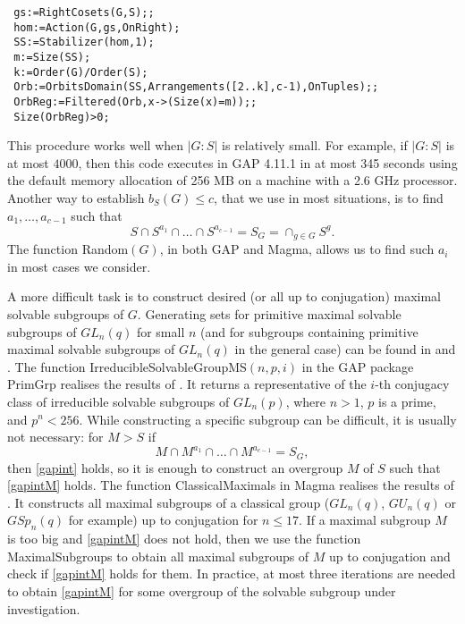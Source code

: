 \lstset{
basicstyle=\ttfamily}  
{\small
\begin{lstlisting}
 gs:=RightCosets(G,S);;
 hom:=Action(G,gs,OnRight);
 SS:=Stabilizer(hom,1);
 m:=Size(SS);
 k:=Order(G)/Order(S);
 Orb:=OrbitsDomain(SS,Arrangements([2..k],c-1),OnTuples);;
 OrbReg:=Filtered(Orb,x->(Size(x)=m));;
 Size(OrbReg)>0;
\end{lstlisting}}

 This procedure works well when $|G:S|$ is relatively small. For example, if $|G:S|$ is at most $4000$, then this code executes in {\sf GAP} 4.11.1 in at most 345 seconds using the default memory allocation of 256 MB  on a machine with a 2.6 GHz processor. Another way to establish  $b_S(G)\le c$, that we use in most situations, is to find $a_1, \ldots, a_{c-1}$ such that 
\begin{equation}
\label{gapint}
S \cap S^{a_1} \cap \ldots \cap S^{a_{c-1}} =S_G=\cap_{g \in G} S^g.
\end{equation}
 The function {\sf Random}$(G)$, in both {\sf GAP} and {\sc Magma}, allows us to find such $a_i$ in most cases we consider. 

A more difficult  task is to construct desired (or all up to conjugation) maximal solvable subgroups of $G$.  Generating sets for primitive maximal solvable subgroups of $GL_n(q)$ for small $n$ (and for subgroups containing primitive maximal solvable subgroups of $GL_n(q)$ in the general case) can be found in \cite{short} and \cite[\S 21]{sup}. The function {\sf IrreducibleSolvableGroupMS}$(n,p,i)$ in the {\sf GAP} package {\sf PrimGrp} \cite{PrimGrp} realises the results of \cite{short}. It returns a representative of the $i$-th conjugacy class of irreducible solvable subgroups of $GL_n(p)$, where $n>1$, $p$ is a prime, and $p^n < 256$.   While constructing a specific subgroup can be difficult, it is usually not necessary:  for $M>S$ if
\begin{equation}
\label{gapintM}
M \cap M^{a_1} \cap \ldots \cap M^{a_{c-1}} =S_G,
\end{equation}
then \eqref{gapint} holds, so it is enough to construct an overgroup $M$ of $S$ such that \eqref{gapintM} holds.   The function {\sf ClassicalMaximals} in  {\sc Magma} realises the results of \cite{maxlow}. It  constructs all maximal subgroups of a classical group ($GL_n(q)$, $GU_n(q)$ or $GSp_n(q)$ for example) up to conjugation for $n \le 17$. If a maximal subgroup $M$ is too big and \eqref{gapintM} does not hold, then we use the function {\sf MaximalSubgroups} to obtain all maximal subgroups of $M$ up to conjugation and check if \eqref{gapintM} holds for them. In practice, at most three iterations are needed to obtain \eqref{gapintM} for some overgroup of the solvable subgroup under investigation.



